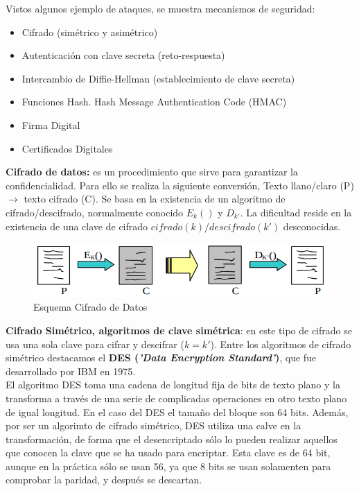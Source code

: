 \documentclass[a4paper,11pt]{article}
\begin{document}
Vistos algunos ejemplo de ataques, se muestra mecanismos de seguridad:

\begin{itemize}
\item Cifrado (simétrico y asimétrico)
\item Autenticación con clave secreta (reto-respuesta)
\item Intercambio de Diffie-Hellman (establecimiento de clave secreta)
\item Funciones Hash. Hash Message Authentication Code (HMAC)
\item Firma Digital
\item Certificados Digitales
\end{itemize}

\textbf{Cifrado de datos:} es un procedimiento que sirve para garantizar la confidencialidad. Para ello se realiza la siguiente conversión, Texto llano/claro (P)$\rightarrow$ texto cifrado (C). Se basa en la existencia de un algoritmo de cifrado/descifrado, normalmente conocido $E_k()$ y $D_{k'}$. La dificultad reside en la existencia de una clave de cifrado $cifrado(k)/descifrado(k')$ desconocidas. 

\begin{figure}[h]
\centering
\caption{Esquema Cifrado de Datos}
\includegraphics[scale=1,width=1\textwidth]{ejemplo_cifrado_datos.png}
\end{figure}

\textbf{Cifrado Simétrico, algoritmos de clave simétrica}: en este tipo de cifrado se usa una sola clave para cifrar y descifrar ($k=k'$). Entre los algoritmos de cifrado simétrico destacamos el \textbf{DES (\textit{'Data Encryption Standard'})}, que fue desarrollado por IBM en 1975. \\

El algoritmo DES toma una cadena de longitud fija de bits de texto plano y la transforma a través de una serie de complicadas operaciones en otro texto plano de igual longitud. En el caso del DES el tamaño del bloque son 64 bits. Además, por ser un algorimto de cifrado simétrico, DES utiliza una calve en la transformación, de forma que el desencriptado sólo lo pueden realizar aquellos que conocen la clave que se ha usado para encriptar. Esta clave es de 64 bit, aunque en la práctica sólo se usan 56, ya que 8 bits se usan solamenten para comprobar la paridad, y después se descartan. \\
\end{document}

